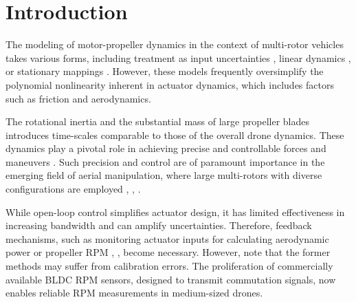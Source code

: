 \section{Introduction}
\par The modeling of motor-propeller dynamics in the context of multi-rotor
vehicles takes various forms, including treatment as input uncertainties \cite{liang2021geometric}, linear dynamics \cite{pounds2010modelling}, or stationary mappings \cite{tayebi2006attitude}. However, these models frequently oversimplify the polynomial nonlinearity inherent in actuator dynamics, which includes factors such as friction and aerodynamics.

The rotational inertia and the substantial mass of large propeller blades
introduces time-scales comparable to those of the overall drone dynamics. These
dynamics play a pivotal role in achieving precise and controllable forces and
maneuvers \cite{hamandi2021design}. Such precision and control are of
paramount importance in the emerging field of aerial manipulation, where large
multi-rotors with diverse configurations are employed \cite{ding2021design},
\cite{ryll20176d}, \cite{jiang2017estimation}.

While open-loop control simplifies actuator design, it has limited
effectiveness in increasing bandwidth \cite{charla2022enhancing} and can
amplify uncertainties. Therefore, feedback mechanisms, such as monitoring
actuator inputs for calculating aerodynamic power \cite{B_Manony} or propeller
RPM \cite{franchi2017adaptive}, \cite{bangura2017thrust}, become necessary.
However, note that the former methods may suffer from calibration errors. The
proliferation of commercially available BLDC RPM sensors, designed to transmit
commutation signals, now enables reliable RPM measurements in medium-sized
drones.

